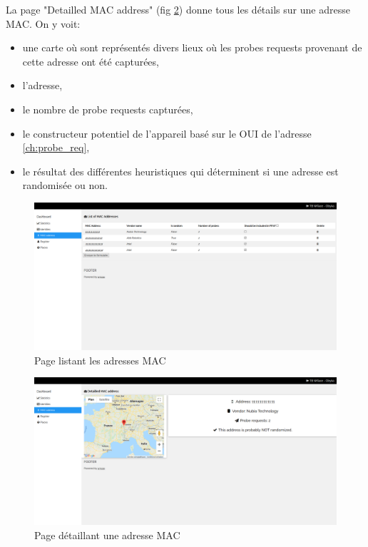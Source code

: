 La page "Detailled MAC address" (fig \ref{fig:dashboard_macs}) donne tous les détails sur une adresse MAC. On y voit:
\begin{itemize}
    \item une carte où sont représentés divers lieux où les probes requests provenant de cette adresse ont été capturées,
    \item l'adresse,
    \item le nombre de probe requests capturées,
    \item le constructeur potentiel de l'appareil basé sur le OUI de l'adresse \ref{ch:probe_req},
    \item le résultat des différentes heuristiques qui déterminent si une adresse est randomisée ou non.
\end{itemize}

\clearpage
\newpage
\thispagestyle{empty}
\begin{landscape}
    \centering
\thispagestyle{empty}
\begin{figure}[H]
	\includegraphics[width=0.95\linewidth]{images/dashboard/macs.png}
	\caption{Page listant les adresses MAC}
	\label{fig:dashboard_list_macs}
\end{figure}
\end{landscape}

\clearpage
\newpage
\thispagestyle{empty}
\begin{landscape}
    \centering
\thispagestyle{empty}
\begin{figure}[H]
	\includegraphics[width=0.95\linewidth]{images/dashboard/detailled_macs.png}
	\caption{Page détaillant une adresse MAC}
	\label{fig:dashboard_macs}
\end{figure}
\end{landscape}

